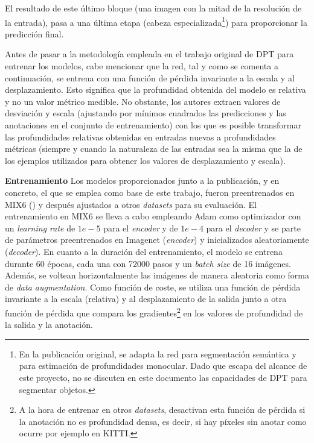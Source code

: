 El resultado de este último bloque (una imagen con la mitad de la resolución de la entrada), pasa a una última etapa (cabeza especializada\footnote{En la publicación original, se adapta la red para segmentación semántica y para estimación de profundidades monocular. Dado que escapa del alcance de este proyecto, no se discuten en este documento las capacidades de DPT para segmentar objetos.}) para proporcionar la predicción final.

Antes de pasar a la metodología empleada en el trabajo original de DPT para entrenar los modelos, cabe mencionar que la red, tal y como se comenta a continuación, se entrena con una función de pérdida invariante a la escala y al desplazamiento. Esto significa que la profundidad obtenida del modelo es relativa y no un valor métrico medible. No obstante, los autores extraen valores de desviación y escala (ajustando por mínimos cuadrados las predicciones y las anotaciones en el conjunto de entrenamiento) con los que es posible transformar las profundidades relativas obtenidas en entradas nuevas a profundidades métricas (siempre y cuando la naturaleza de las entradas sea la misma que la de los ejemplos utilizados para obtener los valores de desplazamiento y escala).

\textbf{Entrenamiento}
Los modelos proporcionados junto a la publicación, y en concreto, el que se emplea como base de este trabajo, fueron preentrenados en MIX6 () y después ajustados a otros \textit{datasets} para su evaluación. El entrenamiento en MIX6 se lleva a cabo empleando Adam como optimizador con un \textit{learning rate} de $1e-5$ para el \textit{encoder} y de $1e-4$ para el \textit{decoder} y se parte de parámetros preentrenados en Imagenet (\textit{encoder}) y inicializados aleatoriamente (\textit{decoder}). En cuanto a la duración del entrenamiento, el modelo se entrena durante 60 épocas, cada una con 72000 pasos y un \textit{batch size} de 16 imágenes. Además, se voltean horizontalmente las imágenes de manera aleatoria como forma de \textit{data augmentation}. Como función de coste, se utiliza una función de pérdida \cite{midas-intel} invariante a la escala (relativa) y al desplazamiento de la salida junto a otra función de pérdida que compara los gradientes\footnote{A la hora de entrenar en otros \textit{datasets}, desactivan esta función de pérdida si la anotación no es profundidad densa, es decir, si hay píxeles sin anotar como ocurre por ejemplo en KITTI.} \cite{MegaDepthLi18} en los valores de profundidad de la salida y la anotación.

